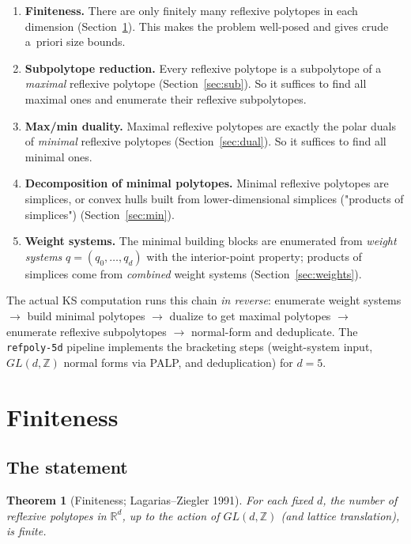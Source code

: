 \documentclass{amsart}
\newtheorem{theorem}{Theorem}[section]
\begin{document}
\begin{enumerate}
  \item[(F)] \textbf{Finiteness.} There are only finitely many reflexive
        polytopes in each dimension (Section~\ref{sec:finite}). This makes
        the problem well-posed and gives crude a~priori size bounds.
  \item[(S)] \textbf{Subpolytope reduction.} Every reflexive polytope is a
        subpolytope of a \emph{maximal} reflexive polytope
        (Section~\ref{sec:sub}). So it suffices to find all maximal ones
        and enumerate their reflexive subpolytopes.
  \item[(D)] \textbf{Max/min duality.} Maximal reflexive polytopes are
        exactly the polar duals of \emph{minimal} reflexive polytopes
        (Section~\ref{sec:dual}). So it suffices to find all minimal ones.
  \item[(M)] \textbf{Decomposition of minimal polytopes.} Minimal reflexive
        polytopes are simplices, or convex hulls built from
        lower-dimensional simplices ("products of simplices")
        (Section~\ref{sec:min}).
  \item[(W)] \textbf{Weight systems.} The minimal building blocks are
        enumerated from \emph{weight systems} $q=(q_0,\dots,q_d)$ with the
        interior-point property; products of simplices come from
        \emph{combined} weight systems (Section~\ref{sec:weights}).
\end{enumerate}

\noindent The actual KS computation runs this chain \emph{in reverse}:
enumerate weight systems $\to$ build minimal polytopes $\to$ dualize to
get maximal polytopes $\to$ enumerate reflexive subpolytopes $\to$
normal-form and deduplicate. The \texttt{refpoly-5d} pipeline implements
the bracketing steps (weight-system input, $GL(d,\mathbb{Z})$ normal forms
via PALP, and deduplication) for $d=5$.

\section{Finiteness}\label{sec:finite}

\subsection{The statement}

\begin{theorem}[Finiteness; Lagarias--Ziegler 1991]\label{thm:finite}
For each fixed $d$, the number of reflexive polytopes in $\mathbb{R}^d$,
up to the action of $GL(d,\mathbb{Z})$ (and lattice translation), is finite.
\end{theorem}
\end{document}
